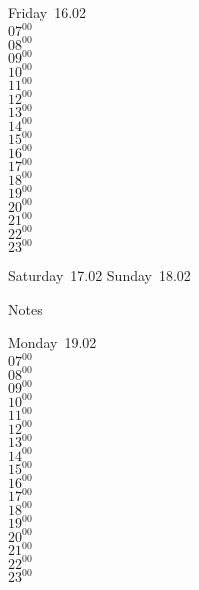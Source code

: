 \documentclass[11pt, a4paper]{book}\usepackage[]{graphicx}\usepackage[]{color}
\begin{document}
\begin{weekdaybox}
  Friday~16.02\\
  { 
  \vfill
  $07^{00}$\\
$08^{00}$\\
$09^{00}$\\
$10^{00}$\\
$11^{00}$\\
$12^{00}$\\
$13^{00}$\\
$14^{00}$\\
$15^{00}$\\
$16^{00}$\\
$17^{00}$\\
$18^{00}$\\
$19^{00}$\\
$20^{00}$\\
$21^{00}$\\
$22^{00}$\\
$23^{00}$\\
  }
\end{weekdaybox}
\begin{weekendbox}
  Saturday~17.02
  \tcblower
  Sunday~18.02
\end{weekendbox} %
\begin{notebox}
  Notes
\end{notebox}
\clearpage
\begin{headerbox}
\end{headerbox}
\begin{weekdaybox}
  Monday~19.02\\
  { 
  \vfill
  $07^{00}$\\
$08^{00}$\\
$09^{00}$\\
$10^{00}$\\
$11^{00}$\\
$12^{00}$\\
$13^{00}$\\
$14^{00}$\\
$15^{00}$\\
$16^{00}$\\
$17^{00}$\\
$18^{00}$\\
$19^{00}$\\
$20^{00}$\\
$21^{00}$\\
$22^{00}$\\
$23^{00}$\\
  }
\end{weekdaybox}
\end{document}
